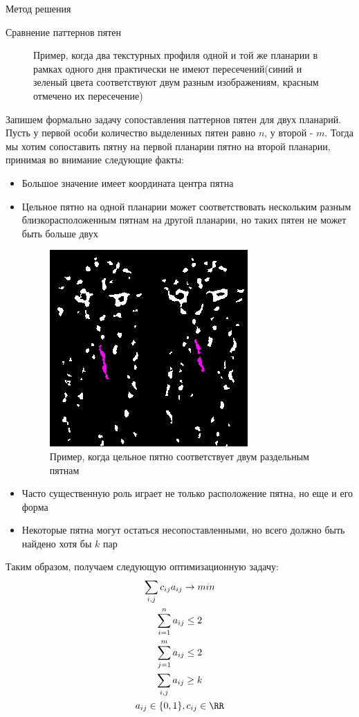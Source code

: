 \documentclass{article}
\begin{document}
\begin{section}{Метод решения}
\begin{subsection}{Сравнение паттернов пятен}
\begin{figure}[H]
\caption{Пример, когда два текстурных профиля одной и той же планарии в рамках одного дня практически не имеют пересечений(синий и зеленый цвета соответствуют двум разным изображениям, красным отмечено их пересечение)}
\label{fig4}
\end{figure}

Запишем формально задачу сопоставления паттернов пятен для двух планарий. Пусть у первой особи количество выделенных пятен равно $n$, у второй - $m$. Тогда мы хотим сопоставить пятну на первой планарии пятно на второй планарии, принимая во внимание следующие факты:

\begin{itemize}
    \item Большое значение имеет координата центра пятна
    \item Цельное пятно на одной планарии может соответствовать нескольким разным близкорасположенным пятнам на другой планарии, но таких пятен не может быть больше двух
    \begin{figure}[H]
    \centering
\includegraphics[scale=0.7]{split.png}
\caption{Пример, когда цельное пятно соответствует двум раздельным пятнам}
\end{figure}
    \item Часто существенную роль играет не только расположение пятна, но еще и его форма
    \item Некоторые пятна могут остаться несопоставленными, но всего должно быть найдено хотя бы $k$ пар
\end{itemize}

Таким образом, получаем следующую оптимизационную задачу:\\
\begin{gather*}
\sum_{i, j}{c_{ij}a_{ij}} \rightarrow min \\
\sum_{i=1}^{n}a_{ij} \leq 2 \\
\sum_{j=1}^{m}a_{ij} \leq 2 \\
\sum_{i, j}a_{ij} \geq k \\
a_{ij} \in \{0, 1\}, c_{ij} \in \RR
\end{gather*}


\end{subsection}
\end{section}
\end{document}
